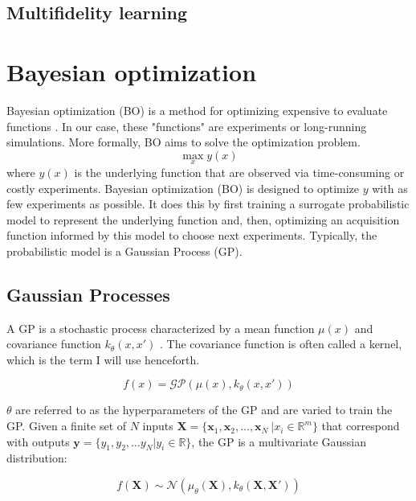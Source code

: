 \subsection{Multifidelity learning}

\section{Bayesian optimization}

Bayesian optimization (BO) is a method for optimizing expensive to evaluate functions \cite{Shahriari2016}. In our case, these "functions" are experiments or long-running simulations. More formally, BO aims to solve the optimization problem.
\begin{equation}
    \max_x y(x)
\end{equation}
where $y(x)$ is the underlying function that are observed via time-consuming or costly experiments. Bayesian optimization (BO) is designed to optimize $y$ with as few experiments as possible. It does this by first training a surrogate probabilistic model to represent the underlying function and, then, optimizing an acquisition function informed by this model to choose next experiments. Typically, the probabilistic model is a Gaussian Process (GP). 

\subsection{Gaussian Processes}

A GP is a stochastic process characterized by a mean function $\mu(x)$ and covariance function $k_{\theta}(x,x')$ \cite{Rasmussen2006}. The covariance function is often called a kernel, which is the term I will use henceforth.

\begin{equation}
    f(x)= \mathcal{GP}(\mu(x), k_{\theta}(x, x'))
\end{equation}

$\theta$ are referred to as the hyperparameters of the GP and are varied to train the GP. Given a finite set of $N$ inputs $\mathbf X = \{\mathbf x_1, \mathbf x_2, \dots, \mathbf x_N \ \vert x_i \in \mathbb R^m \}$ that correspond with outputs $\mathbf y = \{y_1, y_2, \dots y_N \vert  y_i \in \mathbb R \}$, the GP is a multivariate Gaussian distribution:

\begin{equation}
    f(\mathbf X) \sim \mathcal N(\mu_{\theta}(\mathbf X), k_{\theta}(\mathbf X, \mathbf X'))
\end{equation}

